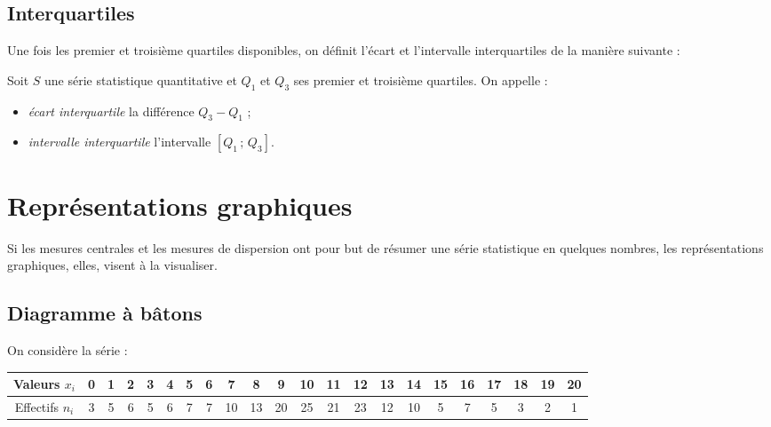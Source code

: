 \subsection{Interquartiles}

Une fois les premier et troisi\`eme quartiles disponibles, on d\'efinit l'\'ecart et l'intervalle interquartiles de la mani\`ere suivante :

\begin{definition}
 Soit $S$ une s\'erie statistique quantitative et $Q_1$ et $Q_3$ ses premier et troisi\`eme quartiles. On appelle :
 \begin{itemize}
  \item \emph{\'ecart interquartile} la diff\'erence $Q_3 - Q_1$ ;
  \item \emph{intervalle interquartile} l'intervalle $[Q_1 \,;\, Q_3]$.
 \end{itemize}

\end{definition}








\section{Repr\'esentations graphiques}

Si les mesures centrales et les mesures de dispersion ont pour but de r\'esumer une s\'erie statistique en quelques nombres, les repr\'esentations graphiques, elles, visent \`a la visualiser.

\subsection{Diagramme \`a bâtons}

On consid\`ere la s\'erie :
\begin{footnotesize}\begin{center}
\begin{tabular}{|*{22}{c|}}\hline
Valeurs $x_i$ & 0 & 1 & 2& 3 & 4& 5& 6& 7 & 8 & 9  & 10 & 11& 12& 13& 14& 15& 16& 17& 18 & 19& 20 \\ \hline
Effectifs $n_i$ & 3 & 5 & 6& 5 & 6& 7& 7& 10& 13& 20 & 25	& 21& 23& 12& 10& 5 & 7 & 5 & 3  & 2 & 1\\ \hline
\end{tabular}
\end{center}\end{footnotesize}

